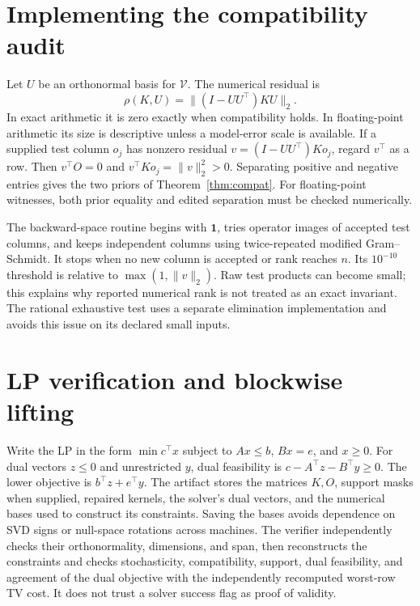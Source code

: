 \documentclass[11pt,letterpaper]{article}
\newcommand{\one}{\mathbf{1}}
\newcommand{\V}{\mathcal{V}}
\begin{document}



\clearpage\appendix
\section{Implementing the compatibility audit}
Let $U$ be an orthonormal basis for $\V$. The numerical residual is
\begin{equation}
\rho(K,U)=\|(I-UU^\top)KU\|_2.
\end{equation}
In exact arithmetic it is zero exactly when compatibility holds. In floating-point arithmetic its size is descriptive unless a model-error scale is available. If a supplied test column $o_j$ has nonzero residual $v=(I-UU^\top)Ko_j$, regard $v^\top$ as a row. Then $v^\top O=0$ and
$v^\top K o_j=\|v\|_2^2>0$.
Separating positive and negative entries gives the two priors of Theorem~\ref{thm:compat}. For floating-point witnesses, both prior equality and edited separation must be checked numerically.

The backward-space routine begins with $\one$, tries operator images of accepted test columns, and keeps independent columns using twice-repeated modified Gram--Schmidt. It stops when no new column is accepted or rank reaches $n$. Its $10^{-10}$ threshold is relative to $\max(1,\|v\|_2)$. Raw test products can become small; this explains why reported numerical rank is not treated as an exact invariant. The rational exhaustive test uses a separate elimination implementation and avoids this issue on its declared small inputs.

\section{LP verification and blockwise lifting}
Write the LP in the form
$\min c^\top x$ subject to $Ax\le b$, $Bx=e$, and $x\ge0$.
For dual vectors $z\le0$ and unrestricted $y$, dual feasibility is
$c-A^\top z-B^\top y\ge0$.
The lower objective is $b^\top z+e^\top y$. The artifact stores the matrices $K,O$, support masks when supplied, repaired kernels, the solver's dual vectors, and the numerical bases used to construct its constraints. Saving the bases avoids dependence on SVD signs or null-space rotations across machines. The verifier independently checks their orthonormality, dimensions, and span, then reconstructs the constraints and checks stochasticity, compatibility, support, dual feasibility, and agreement of the dual objective with the independently recomputed worst-row TV cost. It does not trust a solver success flag as proof of validity.
\end{document}
